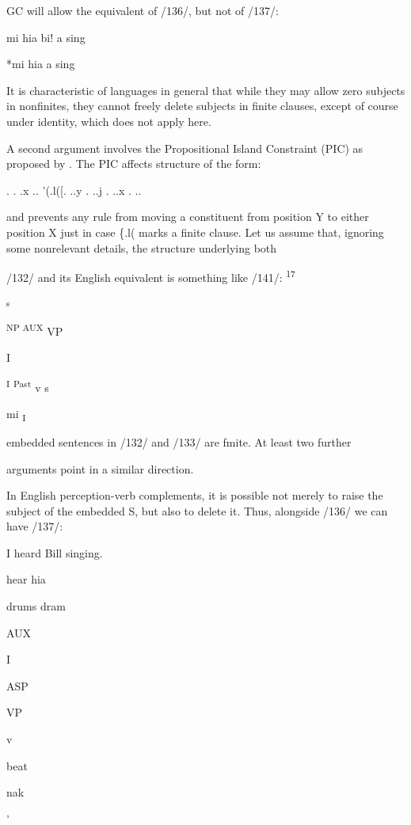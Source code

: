GC will allow the equivalent of /136/, but not of /137/:

\ea\label{ex:138}
 mi hia bi! a sing
\glt
\z

\ea\label{ex:139}
 *mi hia a sing
\glt
\z

It is characteristic of languages in general that while they may allow zero subjects in nonfinites, they cannot freely delete subjects in finite clauses, except of course under identity, which does not apply here.

A second argument involves the Propositional Island Constraint (PIC) as proposed by \citet{Chomsky1977}. The PIC affects structure of the form:

\ea\label{ex:140}
 . . .x .. '(.l([. ..y . ..j . ..x . ..
\glt
\z

and prevents any rule from moving a constituent from position Y to either position X just in case \{.l( marks a finite clause. Let us assume that, ignoring some nonrelevant details, the structure underlying both

/132/ and its English equivalent is something like /141/: \textsuperscript{17}

\ea\label{ex:141}
 \textsubscript{s}
\glt
\z

  


 

\textsuperscript{NP AUX }VP 

I

\textsuperscript{I }\textsuperscript{Past }v s

mi\textsubscript{ }\textsubscript{I}

embedded sentences in /132/ and /133/ are fmite. At least two further

arguments point in a similar direction.

In English perception-verb complements, it is possible not merely to raise the subject of the embedded S, but also to delete it. Thus, alongside /136/ we can have /137/:

\ea\label{ex:136}
 I heard Bill singing.
\glt
\z

hear hia

drums dram

AUX

I

ASP

VP

v 

beat

nak

'


